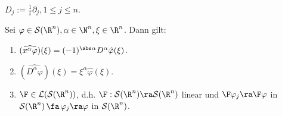 \begin{notation}
$D_j := \frac 1 i \partial_j , 1 \leq j \leq n$.
\end{notation}

\begin{satz}
\label{satz:8.5}
Sei $\varphi \in \mathcal S(\R^n), \alpha \in \N^n, \xi \in \R^n$. Dann gilt:
\begin{enumerate}[\rm(a)]
\item $(\widehat{ x^\alpha \varphi})(\xi) = (-1)^{\abs\alpha} D^\alpha \hat \varphi (\xi)$.
\item $(\widehat{D^{\alpha} \varphi})(\xi) = \xi^\alpha \hat\varphi(\xi)$.
\item $\F\in \mathcal L(\mathcal S(\R^n))$, d.h. $\F:\mathcal S(\R^n) \ra \mathcal S(\R^n)$ linear und $\F\varphi_j \ra \F\varphi$ in $\mathcal S(\R^n) \, \fa \, \varphi_j \ra \varphi$ in $\mathcal S(\R^n)$.
\end{enumerate}
\end{satz}


